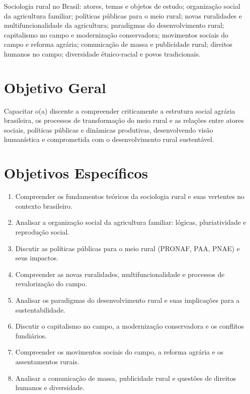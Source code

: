 \documentclass[11pt,a4paper]{article}
\begin{document}
\begin{tcolorbox}[ementabox]
Sociologia rural no Brasil: atores, temas e objetos de estudo; organização social da agricultura familiar; políticas públicas para o meio rural; novas ruralidades e multifuncionalidade da agricultura; paradigmas do desenvolvimento rural; capitalismo no campo e modernização conservadora; movimentos sociais do campo e reforma agrária; comunicação de massa e publicidade rural; direitos humanos no campo; diversidade étnico-racial e povos tradicionais.
\end{tcolorbox}


\section*{Objetivo Geral}

Capacitar o(a) discente a compreender criticamente a estrutura social agrária brasileira, os processos de transformação do meio rural e as relações entre atores sociais, políticas públicas e dinâmicas produtivas, desenvolvendo visão humanística e comprometida com o desenvolvimento rural sustentável.

\section*{Objetivos Específicos}

\begin{enumerate}

\item Compreender os fundamentos teóricos da sociologia rural e suas vertentes no contexto brasileiro.

\item Analisar a organização social da agricultura familiar: lógicas, pluriatividade e reprodução social.

\item Discutir as políticas públicas para o meio rural (PRONAF, PAA, PNAE) e seus impactos.

\item Compreender as novas ruralidades, multifuncionalidade e processos de revalorização do campo.

\item Analisar os paradigmas do desenvolvimento rural e suas implicações para a sustentabilidade.

\item Discutir o capitalismo no campo, a modernização conservadora e os conflitos fundiários.

\item Compreender os movimentos sociais do campo, a reforma agrária e os assentamentos rurais.

\item Analisar a comunicação de massa, publicidade rural e questões de direitos humanos e diversidade.

\end{enumerate}
\end{document}
